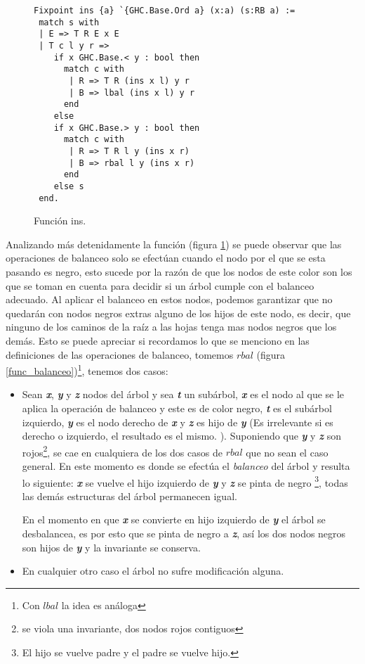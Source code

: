 \begin{figure}[!ht]
\centering
\captionsetup{justification=centering}
\begin{verbatim}
Fixpoint ins {a} `{GHC.Base.Ord a} (x:a) (s:RB a) :=
 match s with
 | E => T R E x E
 | T c l y r =>
    if x GHC.Base.< y : bool then
      match c with
       | R => T R (ins x l) y r
       | B => lbal (ins x l) y r
      end
    else
    if x GHC.Base.> y : bool then
      match c with
       | R => T R l y (ins x r)
       | B => rbal l y (ins x r)
      end
    else s
 end.
\end{verbatim}
\caption{Funci\'on ins.}
\label{func_ins}
\end{figure}

Analizando m\'as detenidamente la funci\'on (figura \ref{func_ins}) se puede observar que las
operaciones de balanceo solo se efectúan cuando el nodo por el que se esta pasando es negro, esto
sucede por la raz\'on de que los nodos de este color son los que se toman en cuenta para decidir si
un \'arbol cumple con el balanceo adecuado. Al aplicar el balanceo en estos nodos, podemos 
garantizar que no quedar\'an con nodos negros extras alguno de los hijos de este nodo, es decir, que
ninguno de los caminos de la ra\'iz a las hojas tenga mas nodos negros que los demás. Esto se puede
apreciar si recordamos lo que se menciono en las definiciones de las operaciones de balanceo, tomemos $rbal$ (figura
\ref{func_balanceo})\footnote{Con $lbal$ la idea es an\'aloga}, tenemos dos casos:

\begin{itemize}
    \item Sean \textbf{\textit{x}}, \textbf{\textit{y}} y \textbf{\textit{z}} nodos del \'arbol y 
    sea \textbf{\textit{t}} un subárbol, \textbf{\textit{x}} es el nodo al que se le aplica la 
    operaci\'on de balanceo y este es de color negro, \textbf{\textit{t}} es el subárbol izquierdo,
    \textbf{\textit{y}} es el nodo derecho de \textbf{\textit{x}} y \textbf{\textit{z}} es hijo de
    \textbf{\textit{y}} (Es irrelevante si es derecho o izquierdo, el resultado es el mismo.
    ). Suponiendo que \textbf{\textit{y}} y \textbf{\textit{z}} son rojos\footnote{se viola una 
    invariante, dos nodos rojos contiguos}, se cae en cualquiera de los dos casos de $rbal$ que no 
    sean el caso general. En este momento es donde se efectúa el \textit{balanceo} del árbol y 
    resulta lo siguiente: \textbf{\textit{x}} se vuelve el hijo izquierdo de \textbf{\textit{y}} y
    \textbf{\textit{z}} se pinta de negro \footnote{El hijo se vuelve padre y el padre se vuelve 
    hijo.}, todas las dem\'as estructuras del \'arbol permanecen igual.

    En el momento en que \textbf{\textit{x}} se convierte en hijo izquierdo de \textbf{\textit{y}}
    el \'arbol se desbalancea, es por esto que se pinta de negro a \textbf{\textit{z}}, así los dos
    nodos negros son hijos de \textbf{\textit{y}} y la invariante se conserva.
    \item En cualquier otro caso el \'arbol no sufre modificaci\'on alguna.
\end{itemize}

